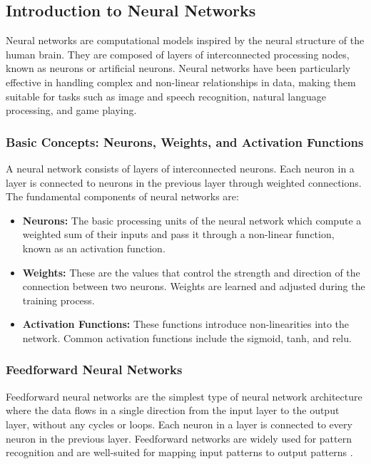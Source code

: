 \subsection{Introduction to Neural Networks}

Neural networks are computational models inspired by the neural structure of the human brain. They are composed of layers of interconnected processing nodes, known as neurons or artificial neurons. Neural networks have been particularly effective in handling complex and non-linear relationships in data, making them suitable for tasks such as image and speech recognition, natural language processing, and game playing.

\subsubsection{Basic Concepts: Neurons, Weights, and Activation Functions}

A neural network consists of layers of interconnected neurons. Each neuron in a layer is connected to neurons in the previous layer through weighted connections. The fundamental components of neural networks are:

\begin{itemize}
    \item \textbf{Neurons:} The basic processing units of the neural network which compute a weighted sum of their inputs and pass it through a non-linear function, known as an activation function.
    
    \item \textbf{Weights:} These are the values that control the strength and direction of the connection between two neurons. Weights are learned and adjusted during the training process.
    
    \item \textbf{Activation Functions:} These functions introduce non-linearities into the network. Common activation functions include the sigmoid, \ac{tanh}, and \ac{relu}.
\end{itemize}

\subsubsection{Feedforward Neural Networks}

Feedforward neural networks are the simplest type of neural network architecture where the data flows in a single direction from the input layer to the output layer, without any cycles or loops. Each neuron in a layer is connected to every neuron in the previous layer. Feedforward networks are widely used for pattern recognition and are well-suited for mapping input patterns to output patterns \cite[p. 93 f.]{ketkar21}.

